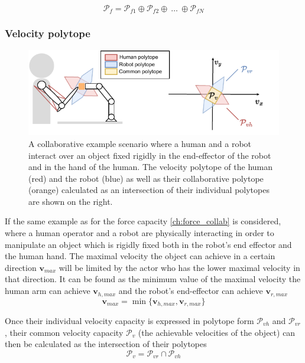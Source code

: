 \begin{equation}
    \mathcal{P}_f =  \mathcal{P}_{f1} \oplus \mathcal{P}_{f2} \oplus ~\ldots ~\oplus  \mathcal{P}_{fN}
\end{equation}

\subsubsection{Velocity polytope}
\label{ch:velocity_collab}
\begin{figure}[!h]
    \centering
    \includegraphics[width=0.7\linewidth]{Chapters/imgs/velocity_collab.pdf}
    \caption{A collaborative example scenario where a human and a robot interact over an object fixed rigidly in the end-effector of the robot and in the hand of the human. The velocity polytope of the human (red) and the robot (blue) as well as their collaborative polytope (orange) calculated as an intersection of their individual polytopes are shown on the right.}
    \label{fig:collaboration_vel}
\end{figure}

If the same example as for the force capacity \ref{ch:force_collab} is considered, where a human operator and a robot are physically interacting in order to manipulate an object which is rigidly fixed both in the robot's end effector and the human hand. The maximal velocity the object can achieve in a certain direction $\bm{v}_{max}$ will be limited by the actor who has the lower maximal velocity in that direction. It can be found as the minimum value of the maximal velocity the human arm can achieve $\bm{v}_{h,max}$ and the robot's end-effector can achieve $\bm{v}_{r,max}$
\begin{equation}
    \bm{v}_{max}= \min \{\bm{v}_{h,max}, \bm{v}_{r,max}\}
\end{equation}

Once their individual velocity capacity is expressed in polytope form $\mathcal{P}_{vh}$ and $\mathcal{P}_{vr}$, their common velocity capacity $\mathcal{P}_v$ (the achievable velocities of the object) can then be calculated as the intersection of their polytopes
\begin{equation}
    \mathcal{P}_v =  \mathcal{P}_{vr} \cap \mathcal{P}_{vh}
\end{equation}

